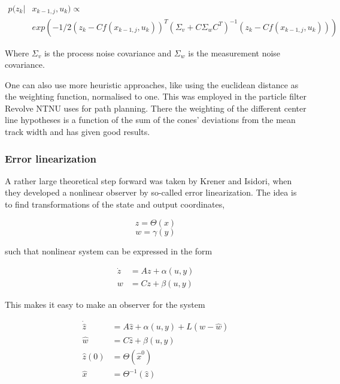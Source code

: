 \begin{align}
    p(z_k| & x_{k-1, j}, u_k) \propto \\
    & exp(-1/2(z_k - Cf(x_{k-1, j}, u_k))^T
    (\Sigma_v + C\Sigma_wC^T)^{-1}(z_k - Cf(x_{k-1, j}, u_k))) \nonumber
\end{align}

Where $\Sigma_v$ is the process noise covariance and $\Sigma_w$ is the measurement noise covariance.  

One can also use more heuristic approaches, like using the euclidean distance as the weighting function, normalised to one. This was employed in the particle filter Revolve NTNU uses for path planning. There the weighting of the different center line hypotheses is a function of the sum of the cones' deviations from the mean track width and has given good results.

\subsubsection{Error linearization}

A rather large theoretical step forward was taken by Krener and Isidori\cite{FirstErrorLinNonlinObs}, when they developed a nonlinear observer by so-called error linearization. The idea is to find transformations of the state and output coordinates, 

\begin{equation}
    z = \Theta(x)
\end{equation}
\begin{equation}
    w = \gamma(y)
\end{equation}

such that nonlinear system can be expressed in the form

\begin{align}
    \Dot{z} &= Az + \alpha(u,y) \\
    w &= Cz + \beta(u,y)
\end{align}

This makes it easy to make an observer for the system

\begin{align}
    \Dot{\hat{z}} &= A\hat{z} + \alpha(u,y) + L(w-\hat{w}) \\
    \hat{w} &= C\hat{z} + \beta(u,y) \\
    \hat{z}(0) &= \Theta(\hat{x}^0) \\ 
    \hat{x} &= \Theta^{-1}(\hat{z})
\end{align}

